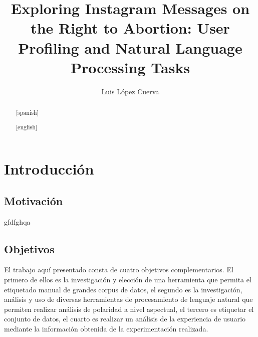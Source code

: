 \documentclass[11pt,english,listoffigures,listoftables]{tfgetsinf}
\title{Exploring Instagram Messages on the Right to Abortion: User Profiling and Natural Language Processing Tasks}
\author{Luis López Cuerva}
\begin{document}

\begin{abstract}


\end{abstract}
\begin{abstract}[spanish]
   


\end{abstract}
\begin{abstract}[english]
   
\end{abstract}


\mainmatter
\chapter{Introducción}\label{Introduccion}


\section{Motivación}
gfdfghqa

\section{Objetivos}

El trabajo aquí presentado consta de cuatro objetivos complementarios. El primero de ellos es la investigación y elección de una herramienta que permita el etiquetado manual de grandes corpus de datos, el segundo es la investigación, análisis y uso de diversas herramientas de procesamiento de lenguaje natural que permiten realizar análisis de polaridad a nivel aspectual, el tercero es etiquetar el conjunto de datos, el cuarto es realizar un análisis de la experiencia de usuario mediante la información obtenida de la experimentación realizada.
\end{document}
